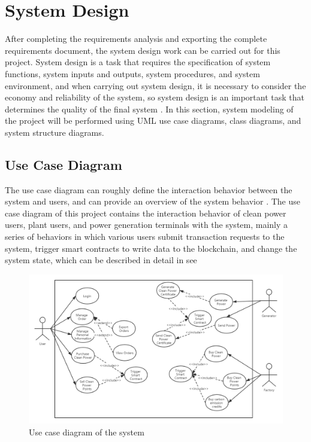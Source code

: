 \chapter{System Design} \label{chapter:design}
After completing the requirements analysis and exporting the complete requirements document, the system design work can be carried out for this project. System design is a task that requires the specification of system functions, system inputs and outputs, system procedures, and system environment, and when carrying out system design, it is necessary to consider the economy and reliability of the system, so system design is an important task that determines the quality of the final system \cite{systemdesignconcept}. In this section, system modeling of the project will be performed using UML use case diagrams, class diagrams, and system structure diagrams.
\section{Use Case Diagram}
The use case diagram can roughly define the interaction behavior between the system and users, and can provide an overview of the system behavior \cite{rosenberg1999use}. The use case diagram of this project contains the interaction behavior of clean power users, plant users, and power generation terminals with the system, mainly a series of behaviors in which various users submit transaction requests to the system, trigger smart contracts to write data to the blockchain, and change the system state, which can be described in detail in see 

\begin{figure}[!htb]
    \centering
    \includegraphics[width=\textwidth]{img/Usecaseforsummerproject.png}
    \caption{Use case diagram of the system}
    \label{fig:usecase}
\end{figure}

